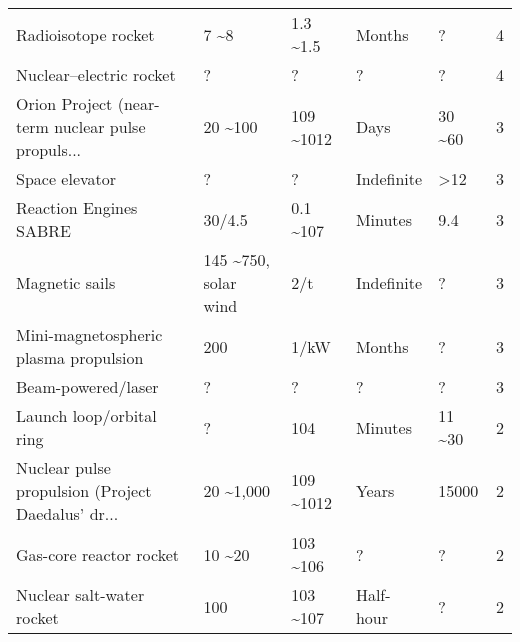 \begin{landscape}
\begin{longtable}{lllllr}
                               Radioisotope rocket &                                7 \textasciitilde 8 &        1.3 \textasciitilde 1.5 &                  Months &                      ? &    4 \\
                           Nuclear–electric rocket &                                    ? &                ? &                       ? &                      ? &    4 \\
 Orion Project (near-term nuclear pulse propuls... &                             20 \textasciitilde 100 &       109 \textasciitilde 1012 &                    Days &                30 \textasciitilde 60 &    3 \\
                                    Space elevator &                                    ? &                ? &              Indefinite &                    >12 &    3 \\
                            Reaction Engines SABRE &                               30/4.5 &        0.1 \textasciitilde 107 &                 Minutes &                    9.4 &    3 \\
                                    Magnetic sails &                145 \textasciitilde 750, solar wind &              2/t &              Indefinite &                      ? &    3 \\
             Mini-magnetospheric plasma propulsion &                                  200 &             1/kW &                  Months &                      ? &    3 \\
                                Beam-powered/laser &                                    ? &                ? &                       ? &                      ? &    3 \\
                          Launch loop/orbital ring &                                    ? &              104 &                 Minutes &                11 \textasciitilde 30 &    2 \\
 Nuclear pulse propulsion (Project Daedalus' dr... &                           20 \textasciitilde 1,000 &       109 \textasciitilde 1012 &                   Years &                  15000 &    2 \\
                           Gas-core reactor rocket &                              10 \textasciitilde 20 &        103 \textasciitilde 106 &                       ? &                      ? &    2 \\
                         Nuclear salt-water rocket &                                  100 &        103 \textasciitilde 107 &               Half-hour &                      ? &    2 \\

\end{longtable}
\end{landscape}
